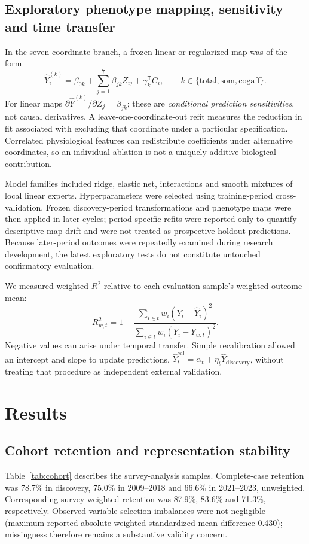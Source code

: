 \documentclass[11pt,a4paper]{article}
\newcommand{\Rtwo}{R^{2}}
\begin{document}
\subsection{Exploratory phenotype mapping, sensitivity and time transfer}
In the seven-coordinate branch, a frozen linear or regularized map was of the form
\begin{equation}
\widehat Y_i^{(k)}=\beta_{0k}+\sum_{j=1}^{7}\beta_{jk}Z_{ij}+\gamma_k^{\mathsf T}C_i,\qquad k\in\{\mathrm{total,som,cogaff}\}.
\label{eq:phenomap}
\end{equation}
For linear maps $\partial \widehat Y^{(k)}/\partial Z_j=\beta_{jk}$; these are \emph{conditional prediction sensitivities}, not causal derivatives. A leave-one-coordinate-out refit measures the reduction in fit associated with excluding that coordinate under a particular specification. Correlated physiological features can redistribute coefficients under alternative coordinates, so an individual ablation is not a uniquely additive biological contribution.

Model families included ridge, elastic net, interactions and smooth mixtures of local linear experts. Hyperparameters were selected using training-period cross-validation. Frozen discovery-period transformations and phenotype maps were then applied in later cycles; period-specific refits were reported only to quantify descriptive map drift and were not treated as prospective holdout predictions. Because later-period outcomes were repeatedly examined during research development, the latest exploratory tests do not constitute untouched confirmatory evaluation.

We measured weighted $\Rtwo$ relative to each evaluation sample's weighted outcome mean:
\begin{equation}
\Rtwo_{w,t}=1-\frac{\sum_{i\in t}w_i(Y_i-\widehat Y_i)^2}{\sum_{i\in t}w_i(Y_i-\overline Y_{w,t})^2}.
\end{equation}
Negative values can arise under temporal transfer. Simple recalibration allowed an intercept and slope to update predictions, $\widehat Y_t^{\mathrm{cal}}=\alpha_t+\eta_t\widehat Y_{\mathrm{discovery}}$, without treating that procedure as independent external validation.

\section{Results}
\subsection{Cohort retention and representation stability}
Table~\ref{tab:cohort} describes the survey-analysis samples. Complete-case retention was 78.7\% in discovery, 75.0\% in 2009--2018 and 66.6\% in 2021--2023, unweighted. Corresponding survey-weighted retention was 87.9\%, 83.6\% and 71.3\%, respectively. Observed-variable selection imbalances were not negligible (maximum reported absolute weighted standardized mean difference 0.430); missingness therefore remains a substantive validity concern.
\end{document}
